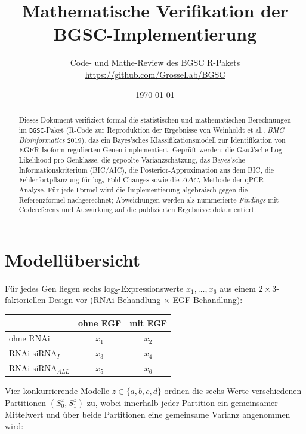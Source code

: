 \documentclass[11pt,a4paper]{article}
\title{Mathematische Verifikation der BGSC-Implementierung}
\author{Code- und Mathe-Review des BGSC R-Pakets\\[2pt]
\small \url{https://github.com/GrosseLab/BGSC}}
\date{\today}
\begin{document}
\maketitle

\begin{abstract}
Dieses Dokument verifiziert formal die statistischen und mathematischen
Berechnungen im \texttt{BGSC}-Paket (R-Code zur Reproduktion der Ergebnisse
von Weinholdt et al., \emph{BMC Bioinformatics} 2019), das ein
Bayes'sches Klassifikationsmodell zur Identifikation von EGFR-Isoform-regulierten
Genen implementiert. Geprüft werden: die Gauß'sche Log-Likelihood pro
Genklasse, die gepoolte Varianzschätzung, das Bayes'sche
Informationskriterium (BIC/AIC), die Posterior-Approximation aus dem BIC,
die Fehlerfortpflanzung für log$_2$-Fold-Changes sowie die
$\Delta\Delta C_t$-Methode der qPCR-Analyse. Für jede Formel wird die
Implementierung algebraisch gegen die Referenzformel nachgerechnet; Abweichungen
werden als nummerierte \emph{Findings} mit Codereferenz und Auswirkung auf die
publizierten Ergebnisse dokumentiert.
\end{abstract}

\tableofcontents

\section{Modellübersicht}
\label{sec:model}

Für jedes Gen liegen sechs log$_2$-Expressionswerte $x_1,\dots,x_6$ aus einem
$2\times3$-faktoriellen Design vor (RNAi-Behandlung $\times$ EGF-Behandlung):

\begin{center}
\begin{tabular}{lcc}
\toprule
 & ohne EGF & mit EGF \\
\midrule
ohne RNAi & $x_1$ & $x_2$ \\
RNAi $\text{siRNA}_I$ & $x_3$ & $x_4$ \\
RNAi $\text{siRNA}_{ALL}$ & $x_5$ & $x_6$ \\
\bottomrule
\end{tabular}
\end{center}

Vier konkurrierende Modelle $z \in \{a,b,c,d\}$ ordnen die sechs Werte
verschiedenen Partitionen $(S_0^z, S_1^z)$ zu, wobei innerhalb jeder Partition
ein gemeinsamer Mittelwert und über beide Partitionen eine gemeinsame Varianz
angenommen wird:
\end{document}
